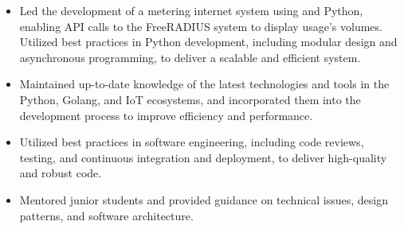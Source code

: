 {\begin{itemize}
                  delivering a comprehensive and insightful dashboard for data analysis and decision-making.
            \item Led the development of a metering internet system using  and Python,
                  enabling API calls to the FreeRADIUS system to display usage's volumes.
                  Utilized best practices in Python development, including modular design and asynchronous programming,
                  to deliver a scalable and efficient system.
            \item Maintained up-to-date knowledge of the latest technologies and tools in the Python,
                  Golang, and IoT ecosystems, and incorporated them into the development process to improve efficiency and performance.
            \item Utilized best practices in software engineering, including code reviews, testing, and continuous
                  integration and deployment, to deliver high-quality and robust code.
            \item Mentored junior students and provided guidance on technical issues,
                  design patterns, and software architecture.
      \end{itemize}
}
